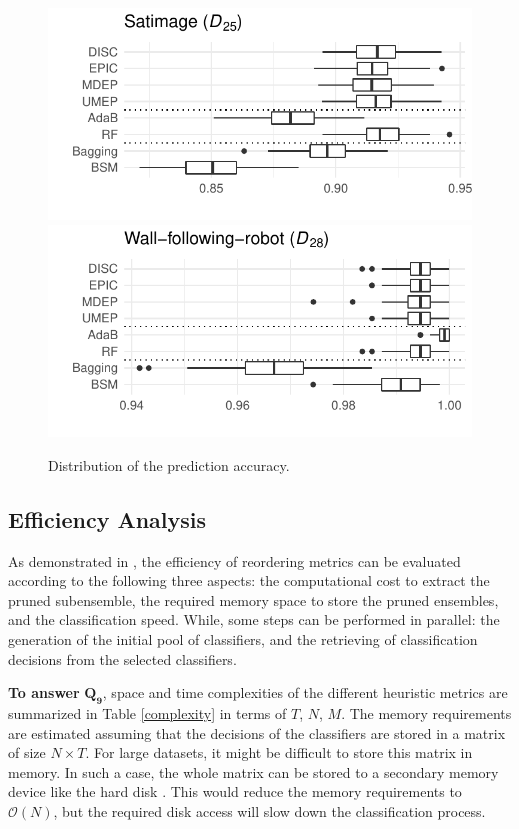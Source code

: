 \begin{figure}[!ht]
\begin{center}
   \includegraphics[width=.49\textwidth]{6_analysis/fig/boxplot-Satimage.pdf}
  \includegraphics[width=.49\textwidth]{6_analysis/fig/boxplot-Wall-following-robot.pdf}
\end{center}
\caption{Distribution of the prediction accuracy.}
\label{ch6_consprediction}
\end{figure}


\subsection{Efficiency Analysis } \label{eff.analysis}

As demonstrated in \cite{martinez2009}, the efficiency of reordering metrics can be evaluated according to the following three aspects: the computational cost to extract the pruned subensemble, the required memory space to store the pruned ensembles, and the classification speed.  While, some steps can be performed in parallel: the generation of the initial pool of classifiers, and the retrieving of classification decisions from the selected classifiers.  


\textbf{To answer} $\pmb{Q_9}$, space and time complexities of the different heuristic metrics are summarized in Table \ref{complexity} in terms of $T$, $N$, $M$. The memory requirements are estimated assuming that the decisions of the classifiers are stored in a matrix of size $N \times T$. For large datasets, it might be difficult to store this matrix in memory. In such a case, the whole matrix can be stored to a secondary memory device like the hard disk \cite{martinez2009}. This would reduce the memory requirements to $\mathcal{O}( N )$, but the required disk access will slow down the classification process.   


